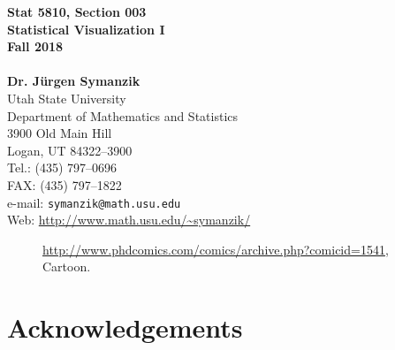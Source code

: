 \documentclass[12pt,letterpaper,final]{article}
\begin{document}





\begin{titlepage}
\vspace*{4.5cm}
\begin{center}
{\LARGE \bf Stat 5810, Section 003} \\[0.5cm]
{\LARGE \bf Statistical Visualization I} \\[0.5cm]
{\LARGE \bf Fall 2018} \\[0.5cm]
~ \\[2cm]
{\bf Dr. J\"urgen Symanzik} \\[0.3cm]
Utah State University \\[0.3cm]
Department of Mathematics and Statistics \\[0.3cm]
3900 Old Main Hill \\[0.3cm]
Logan, UT 84322--3900 \\[0.8cm]
Tel.: (435) 797--0696 \\[0.3cm]
FAX: (435) 797--1822 \\[0.3cm]
e-mail: \verb|symanzik@math.usu.edu| \\[0.3cm]
Web: \url{http://www.math.usu.edu/~symanzik/}
\end{center}

\thispagestyle{empty}
\vfill
\end{titlepage}

\newpage

\thispagestyle{empty}

\vspace*{5cm}

\begin{figure}[ht]
\caption{\label{PhdcomicsCom_Plotting}
\url{http://www.phdcomics.com/comics/archive.php?comicid=1541}, \\
Cartoon.
}
\end{figure}


\newpage


\setcounter{page}{1}

\tableofcontents

\newpage

%


\section*{Acknowledgements}
\end{document}

